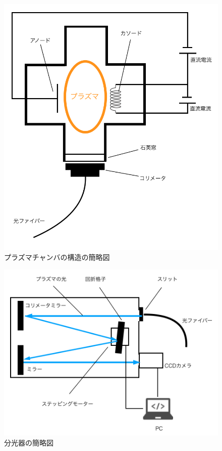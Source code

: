 \begin{figure}
    \centering
    \includegraphics[width=15cm]{pictures/chamber-simple.png}
    \caption{プラズマチャンバの構造の簡略図}
    \label{fig:chamber-simple}
\end{figure}

\begin{figure}
    \centering
    \includegraphics[width=15cm]{pictures/spectrometer-picture.png}
    \caption{分光器の簡略図}
    \label{fig:spectrometer-picture}
\end{figure}

